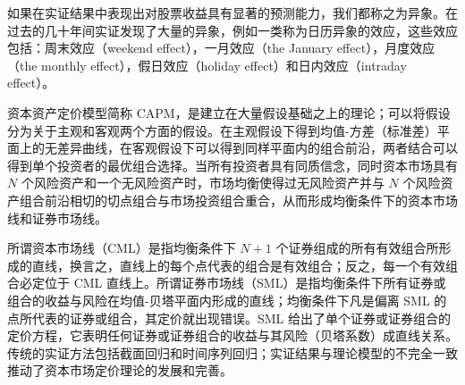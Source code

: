 

\begin{tcolorbox}[summary,title=本章小结]
如果在实证结果中表现出对股票收益具有显著的预测能力，我们都称之为异象。在过去的几十年间实证发现了大量的异象，例如一类称为日历异象的效应，这些效应包括：周末效应（weekend effect），一月效应（the January effect），月度效应（the monthly effect），假日效应（holiday effect）和日内效应（intraday effect）。

资本资产定价模型简称 CAPM，是建立在大量假设基础之上的理论；可以将假设分为关于主观和客观两个方面的假设。在主观假设下得到均值-方差（标准差）平面上的无差异曲线，在客观假设下可以得到同样平面内的组合前沿，两者结合可以得到单个投资者的最优组合选择。当所有投资者具有同质信念，同时资本市场具有 $N$ 个风险资产和一个无风险资产时，市场均衡使得过无风险资产并与 $N$ 个风险资产组合前沿相切的切点组合与市场投资组合重合，从而形成均衡条件下的资本市场线和证券市场线。

所谓资本市场线（CML）是指均衡条件下 $N+1$ 个证券组成的所有有效组合所形成的直线，换言之，直线上的每个点代表的组合是有效组合；反之，每一个有效组合必定位于 CML 直线上。所谓证券市场线（SML）是指均衡条件下所有证券或组合的收益与风险在均值-贝塔平面内形成的直线；均衡条件下凡是偏离 SML 的点所代表的证券或组合，其定价就出现错误。SML 给出了单个证券或证券组合的定价方程，它表明任何证券或证券组合的收益与其风险（贝塔系数）成直线关系。传统的实证方法包括截面回归和时间序列回归；实证结果与理论模型的不完全一致推动了资本市场定价理论的发展和完善。
\end{tcolorbox}



